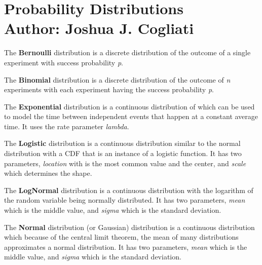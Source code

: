 \section{Probability Distributions  \\ \vspace{2 mm} {\small Author: Joshua J. Cogliati}}

\newcommand{\distname}[1]{\textbf{#1}}

\newcommand{\distattrib}[1]{\textit{#1}}


The \distname{Bernoulli} distribution is a discrete distribution of
the outcome of a single experiment with success probability
\distattrib{p}.


The \distname{Binomial} distribution is a discrete distribution of the
outcome of \distattrib{n} experiments with each experiment having the
success probability \distattrib{p}.


The \distname{Exponential} distribution is a continuous distribution
of which can be used to model the time between independent events that
happen at a constant average time.  It uses the rate parameter
\distattrib{lambda}.


The \distname{Logistic} distribution is a continuous distribution
similar to the normal distribution with a CDF that is an instance of a
logistic function.  It has two parameters, \distattrib{location} with
is the most common value and the center, and \distattrib{scale} which
determines the shape.


The \distname{LogNormal} distribution is a continuous distribution
with the logarithm of the random variable being normally distributed.
It has two parameters, \distattrib{mean} which is the middle value,
and \distattrib{sigma} which is the standard deviation.


The \distname{Normal} distribution (or Gaussian) distribution is a
continuous distribution which because of the central limit theorem,
the mean of many distributions approximates a normal distribution.  It
has two parameters, \distattrib{mean} which is the middle value, and
\distattrib{sigma} which is the standard deviation.

